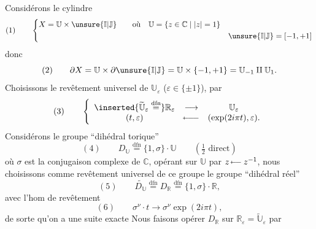 Considérons le cylindre 
\[
(1)\qquad\left\{\begin{aligned}
X&=\mathbb U\times\unsure{\mathbb I|\mathbb J}\qquad\text{où}\quad \mathbb U=\{z\in\mathbb C\mid |z|=1\}\\
&&\unsure{\mathbb I|\mathbb J}=[-1,+1]
\end{aligned}\right.
\]
donc
\[
(2)\qquad \partial X=\mathbb U\times\partial\unsure{\mathbb I|\mathbb J}=\mathbb U\times\{-1,+1\}=\mathbb U_{-1}\amalg\mathbb U_1.
\]
Choisissons le revêtement universel  de $\mathbb U_\varepsilon$ ($\varepsilon\in\{\pm1\}$), par
\[
(3)\qquad\left\{\begin{array}{ccc}
\inserted{\widetilde{\mathbb U}_\varepsilon\overset{\mathrm{dfn}}{=}}\mathbb R_\varepsilon&\longrightarrow&\mathbb U_\varepsilon\\
(t,\varepsilon)&\mathbin{\mapstochar\!\relbar\!\relbar\!\relbar}&(\exp(2i\pi t),\varepsilon).
\end{array}\right.
\]
Considérons le groupe ``dihédral torique''
\[
(4)\qquad D_{\mathbb U}\overset{\mathrm{dfn}}{=}\{1,\sigma\}\cdot\mathbb U\qquad(\tfrac12\text{ direct})
\]
où $\sigma$ est la conjugaison complexe de $\mathbb C$, opérant sur $\mathbb U$ par $z\mathbin{\mapstochar\!\relbar\!\relbar}z^{-1}$, nous choisissons comme revêtement universel de ce groupe le groupe ``dihédral réel''
\[
(5)\qquad \widetilde{D_{\mathbb U}}\overset{\mathrm{dfn}}{=}D_{\mathbb R}\overset{\mathrm{dfn}}{=}\{1,\sigma\}\cdot\mathbb R,
\]
avec l'hom de revêtement
\[
(6)\qquad \sigma^\nu\cdot t\longrightarrow\sigma^\nu\exp(2i\pi t),
\]
de sorte qu'on a une suite exacte
Nous faisons opérer $D_{\mathbb R}$ sur $\mathbb R_\varepsilon=\widetilde{\mathbb U}_\varepsilon$ par


